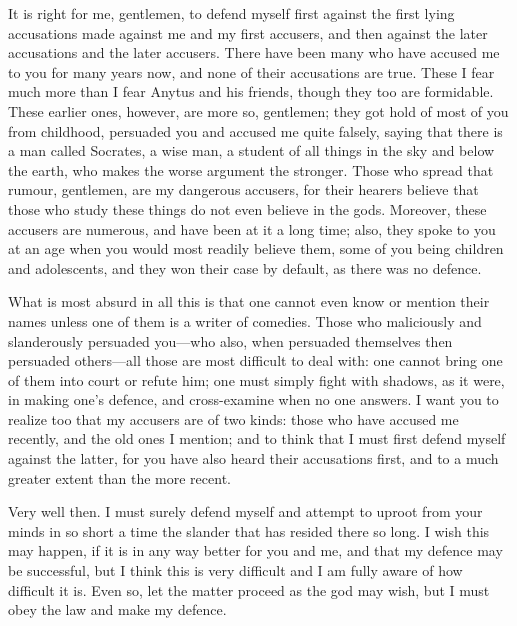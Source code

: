It is right for me, gentlemen, to defend myself first against the first lying accusations made
against me and my first accusers, and then against the later accusations and the later accusers.
There have been many who have accused me to you for many years now, and none of their
accusations are true. These I fear much more than I fear Anytus and his friends, though they too
are formidable. These earlier ones, however, are more so, gentlemen; they got hold of most of you
from childhood, persuaded you and accused me quite falsely, saying that there is a man called
Socrates, a wise man, a student of all things in the sky and below the earth, who makes the worse
argument the stronger. Those who spread that rumour, gentlemen, are my dangerous accusers, for
their hearers believe that those who study these things do not even believe in the gods. Moreover,
these accusers are numerous, and have been at it a long time; also, they spoke to you at an age
when you would most readily believe them, some of you being children and adolescents, and they
won their case by default, as there was no defence.

What is most absurd in all this is that one cannot even know or mention their names unless one
of them is a writer of comedies. Those who maliciously and slanderously persuaded you—who
also, when persuaded themselves then persuaded others—all those are most difficult to deal with:
one cannot bring one of them into court or refute him; one must simply fight with shadows, as it
were, in making one's defence, and cross-examine when no one answers. I want you to realize too
that my accusers are of two kinds: those who have accused me recently, and the old ones I
mention; and to think that I must first defend myself against the latter, for you have also heard their
accusations first, and to a much greater extent than the more recent.

Very well then. I must surely defend myself and attempt to uproot from your minds in so short
a time the slander that has resided there so long. I wish this may happen, if it is in any way better
for you and me, and that my defence may be successful, but I think this is very difficult and I am
fully aware of how difficult it is. Even so, let the matter proceed as the god may wish, but I must
obey the law and make my defence.

